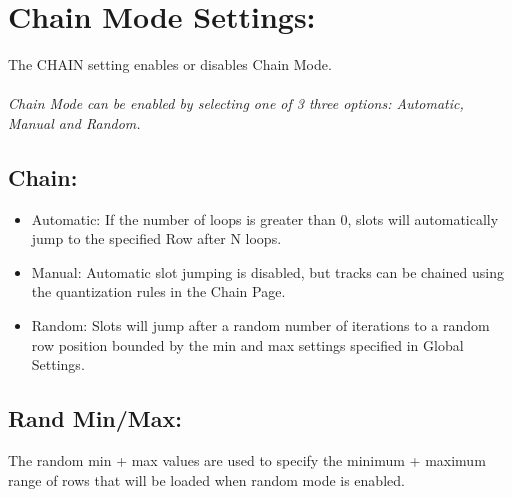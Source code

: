 \chapter{Chain Mode Settings:}
The CHAIN setting enables or disables Chain Mode.\\
\\
\textit{ Chain Mode can be enabled by selecting one of 3 three options: Automatic, Manual and Random.}
\\
\section{Chain:}
\begin{itemize}
\item Automatic: If the number of loops is greater than 0, slots will automatically jump to the specified Row after N loops.
\item Manual: Automatic slot jumping is disabled, but tracks can be chained using the quantization rules in the Chain Page.
\item Random: Slots will jump after a random number of iterations to a random row position bounded by the min and max settings specified in Global Settings.
\end{itemize}
\section{Rand Min/Max:} The random min + max values are used to specify the minimum + maximum range of rows that will be loaded when random mode is enabled.
